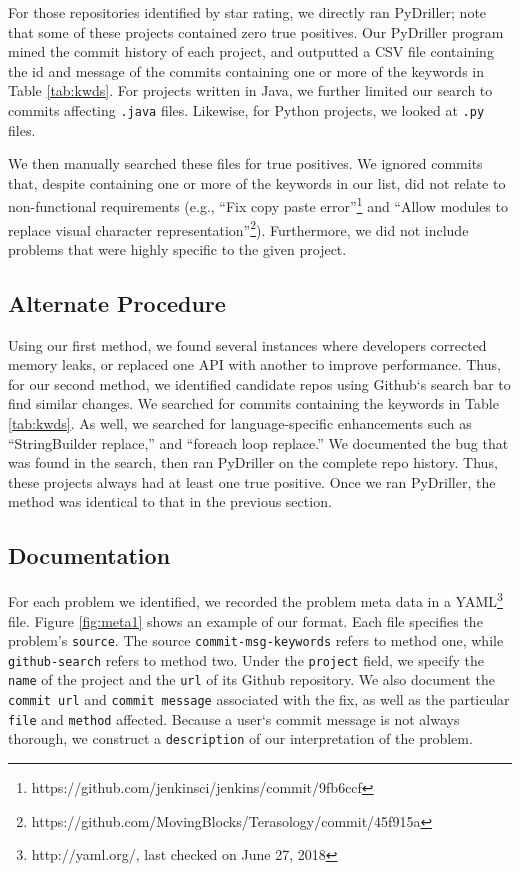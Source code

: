 \documentclass[sigconf]{acmart}
\begin{document}
For those repositories identified by star rating, we directly ran PyDriller; note that some of these projects contained zero true positives. 
Our PyDriller program mined the commit history of each project, and outputted a CSV file containing the id and message of the commits containing one or more of the keywords in Table \ref{tab:kwds}. For projects written in Java, we further limited our search to commits affecting \texttt{.java} files. Likewise, for Python projects, we looked at \texttt{.py} files.

We then manually searched these files for true positives. We ignored commits that, despite containing one or more of the keywords in our list, did not relate to non-functional requirements (e.g., ``Fix copy paste error''\footnote{https://github.com/jenkinsci/jenkins/commit/9fb6ccf} and ``Allow modules to replace visual character representation''\footnote{https://github.com/MovingBlocks/Terasology/commit/45f915a}). Furthermore, we did not include problems that were highly specific to the given project. 


\subsection{Alternate Procedure}
Using our first method, we found several instances where developers corrected memory leaks, or replaced one API with another to improve performance. Thus, for our second method, we identified candidate repos using Github`s search bar to find similar changes. We searched for commits containing the keywords in Table \ref{tab:kwds}. As well, we searched for language-specific enhancements such as ``StringBuilder replace,'' and ``foreach loop replace.'' We documented the bug that was found in the search, then ran PyDriller on the complete repo history. Thus, these projects always had at least one true positive. Once we ran PyDriller, the method was identical to that in the previous section.

\subsection{Documentation} 
For each problem we identified, we recorded the problem meta data in a YAML\footnote{http://yaml.org/, last checked on June 27, 2018} file. Figure \ref{fig:meta1} shows an example of our format. Each file specifies the problem's \texttt{source}. The source \texttt{commit-msg-keywords} refers to method one, while \texttt{github-search} refers to method two. Under the \texttt{project} field, we specify the \texttt{name} of the project and the \texttt{url} of its Github repository. We also document the \texttt{commit url} and \texttt{commit message} associated with the fix, as well as the particular \texttt{file} and \texttt{method} affected. Because a user`s commit message is not always thorough, we construct a \texttt{description} of our interpretation of the problem.
\end{document}
